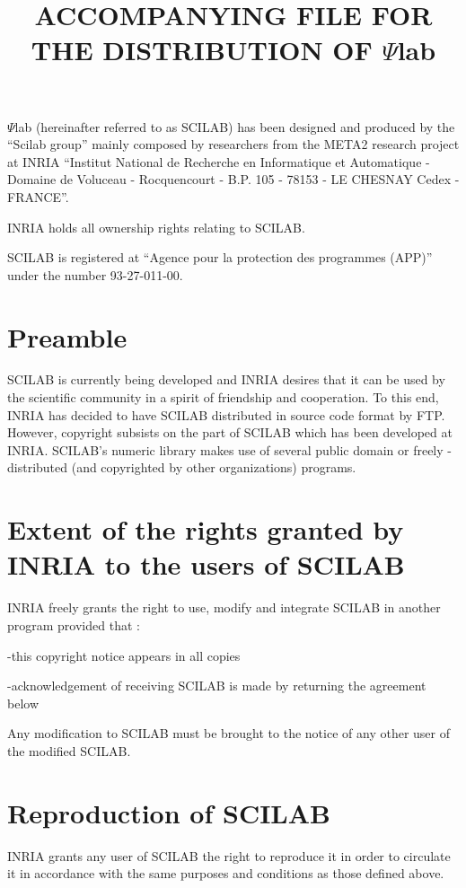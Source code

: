 \textheight=680pt \textwidth=470pt
\topmargin=-117pt
\oddsidemargin=0pt \evensidemargin=0pt \marginparwidth=60pt
\title{ACCOMPANYING FILE FOR THE DISTRIBUTION OF $\Psi$lab}
\author{ }
\date{ }

\maketitle{}
\thispagestyle{empty}
\pagestyle{empty}
$\Psi$lab (hereinafter referred to as SCILAB) has been 
designed and produced  by the ``Scilab group'' mainly
composed by researchers from the META2 research project at INRIA 
``Institut National de Recherche en Informatique et Automatique - Domaine de
Voluceau - Rocquencourt - B.P. 105 - 78153 - LE CHESNAY Cedex - FRANCE''.

INRIA holds all ownership rights relating to SCILAB.

SCILAB is registered at ``Agence pour la protection des programmes (APP)''
under the number 93-27-011-00.

\section{Preamble}
SCILAB is currently being developed and INRIA desires that it can be used by
the scientific community in a spirit of friendship and cooperation. To this
end, INRIA has decided to have SCILAB distributed in source code format by
FTP. However, copyright subsists on the part of SCILAB which has been 
developed at INRIA. SCILAB's numeric library makes use of several public
domain or freely - distributed (and copyrighted by other organizations)
programs.

\section{Extent of the rights granted by INRIA to the users of SCILAB}
INRIA freely grants the right to use, modify and integrate SCILAB in another
program provided that :

-this copyright notice appears in all copies

-acknowledgement of receiving SCILAB is made by returning the agreement below

\noindent
Any modification to SCILAB must be brought to the notice of any other user of
the modified SCILAB.

\section{Reproduction of SCILAB}
INRIA grants any user of SCILAB the right to reproduce it in order to
circulate it in accordance with the same purposes and conditions as those
defined above.

